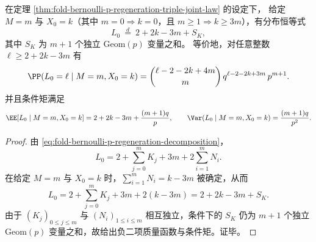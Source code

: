 \begin{theorem}\label{thm:fold-bernoulli-p-regeneration-conditional-length-shifted-nb}
在定理 \ref{thm:fold-bernoulli-p-regeneration-triple-joint-law} 的设定下，
给定 \(M=m\) 与 \(X_0=k\)（其中 \(m=0\Rightarrow k=0\)，且 \(m\ge 1\Rightarrow k\ge 3m\)），有分布恒等式
\[
L_0\ \stackrel{d}{=}\ 2+2k-3m+S_K,
\]
其中 \(S_K\) 为 \(m+1\) 个独立 \(\mathrm{Geom}(p)\) 变量之和。
等价地，对任意整数 \(\ell\ge 2+2k-3m\) 有
\[
\PP(L_0=\ell\mid M=m,X_0=k)
=\binom{\ell-2-2k+4m}{m}\,q^{\ell-2-2k+3m}\,p^{m+1}.
\]
并且条件矩满足
\[
\EE[L_0\mid M=m,X_0=k]=2+2k-3m+\frac{(m+1)q}{p},
\qquad
\Var(L_0\mid M=m,X_0=k)=\frac{(m+1)q}{p^2}.
\]
\end{theorem}
\begin{proof}
由 \eqref{eq:fold-bernoulli-p-regeneration-decomposition}，
\[
L_0=2+\sum_{j=0}^{m}K_j+3m+2\sum_{i=1}^{m}N_i.
\]
在给定 \(M=m\) 与 \(X_0=k\) 时，\(\sum_{i=1}^{m}N_i=k-3m\) 被确定，从而
\[
L_0=2+\sum_{j=0}^{m}K_j+3m+2(k-3m)=2+2k-3m+S_K.
\]
由于 \((K_j)_{0\le j\le m}\) 与 \((N_i)_{1\le i\le m}\) 相互独立，条件下的 \(S_K\) 仍为 \(m+1\) 个独立 \(\mathrm{Geom}(p)\) 变量之和，故给出负二项质量函数与条件矩。证毕。
\end{proof}

